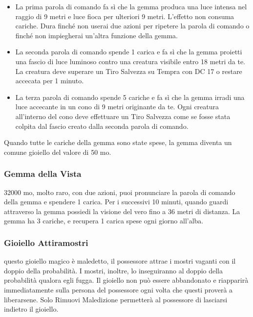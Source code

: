 \begin{multicols}{2}
\begin{itemize}
\item
La prima parola di comando fa sì che la gemma produca una luce intensa nel raggio di 9 metri e luce fioca per ulteriori 9 metri. L'effetto non consuma cariche. Dura finché non userai due azioni per ripetere la parola di comando o finché non impiegherai un'altra funzione della gemma.

\item
La seconda parola di comando spende 1 carica e fa sì che la gemma proietti una fascio di luce luminoso contro una creatura visibile entro 18 metri da te. La creatura deve superare un Tiro Salvezza su Tempra con DC 17 o restare accecata per 1 minuto.

\item
La terza parola di comando spende 5 cariche e fa sì che la gemma irradi una luce accecante in un cono di 9 metri originante da te. Ogni creatura all'interno del cono deve effettuare un Tiro Salvezza come se fosse stata colpita dal fascio creato dalla seconda parola di comando.

\end{itemize}

\medskip

Quando tutte le cariche della gemma sono state spese, la gemma diventa un comune gioiello del valore di 50 mo.

\subsubsection*{Gemma della Vista}
32000 mo, molto raro, con due azioni, puoi pronunciare la parola di comando della gemma e spendere 1 carica. Per i successivi 10 minuti, quando guardi attraverso la gemma possiedi la visione del vero fino a 36 metri di distanza. La gemma ha 3 cariche, e recupera 1 carica spese ogni giorno all'alba.

\subsubsection*{Gioiello Attiramostri}
questo gioiello magico è maledetto, il possessore attrae i mostri vaganti con il doppio della probabilità. I mostri, inoltre, lo inseguiranno al doppio della probabilità qualora egli fugga. Il gioiello non può essere abbandonato e riapparirà immediatamente sulla persona del possessore ogni volta che questi proverà a liberarsene. Solo Rimuovi Maledizione permetterà al possessore di lasciarsi indietro il gioiello.


\end{multicols}
